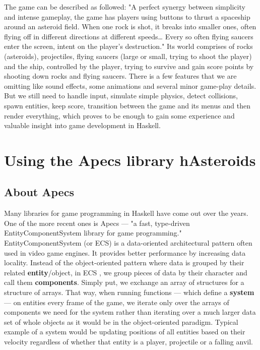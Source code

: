 \documentclass[
  digital, %
  color,   %
  table,   %
  oneside, %
  lof,     %
  lot,     %
]{fithesis3}
\begin{document}
The game can be described as followed:
"A perfect synergy between simplicity and intense gameplay, the game has players using buttons to thrust a spaceship around an asteroid field. When one rock is shot, it breaks into smaller ones, often flying off in different directions at different speeds\ldots{} Every so often flying saucers enter the screen, intent on the player’s destruction."\cite{aboutasteroids}
Its world comprises of rocks (asteroids), projectiles,
flying saucers (large or small, trying to shoot the player) and the ship, controlled by the player,
trying to survive and gain score points by shooting down rocks and flying saucers.
There is a few features that we are omitting like sound effects, some animations
and several minor game-play details. But we still need to handle input, simulate simple physics,
detect collisions, spawn entities, keep score, transition between the game
and its menus and then render everything, which proves to be enough to gain
some experience and valuable insight into game development in Haskell.



\chapter{Using the Apecs library \textemdash{} hAsteroids}
\label{chptr:hasteroids}

\section{About Apecs}
\label{sect:apecs}
Many libraries for game programming in Haskell have come out over the years.
One of the more recent ones is Apecs — "a fast, type-driven
Entity\textendash{}Component\textendash{}System library for game programming."\cite{apecsrepo}
Entity\textendash{}Component\textendash{}System (or ECS) is a data-oriented architectural pattern often
used in video game engines. It provides better performance
by increasing data locality. Instead of the object-oriented pattern
where data is grouped by their related \textbf{entity}/object, in ECS
, we group pieces of data by their character and call them \textbf{components}.
Simply put, we exchange an array of structures for a structure of arrays.
That way, when running functions — which define a \textbf{system} — on entities
every frame of the game, we iterate only over the arrays of components
we need for the system rather than iterating over a much
larger data set of whole objects as it would be in the object-oriented paradigm.
Typical example of a system would be updating positions of all entities
based on their velocity regardless of whether that entity is a player,
projectile or a falling anvil.
\end{document}
